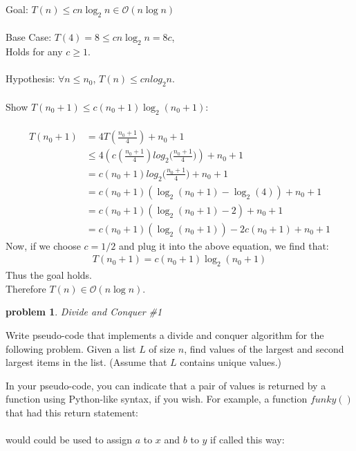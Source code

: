 \documentclass[10pt]{article}
\newtheorem{problem}{\sc\color{cit}problem}
\begin{document}
\begin{enumerate}
    	Goal: $T(n) \leq cn\log_2{n} \in \mathcal{O}(n\log{n})$ \\ \\
    	Base Case: $T(4) = 8 \leq cn\log_2{n} = 8c$, \\
    	Holds for any $c \geq 1$. \\ \\
    	Hypothesis: $\forall n \leq n_0$, $T(n) \leq cnlog_2{n}$. \\ \\
    	Show $T(n_0 + 1) \leq c(n_0 + 1)\log_2{(n_0 + 1)}$: \\ \\
    	\begin{align*}
    	    T(n_0 + 1) &= 4T(\frac{n_0 + 1}{4}) + n_0 + 1 \\
    	    &\leq 4\left(c(\frac{n_0 + 1}{4})log_2{(\frac{n_0 + 1}{4}})\right) + n_0 + 1 \\
    	    &= c(n_0 + 1)log_2{(\frac{n_0 + 1}{4}}) + n_0 + 1 \\
    	    &= c(n_0 + 1)\left(\log_2(n_0 + 1) - \log_2(4)\right) + n_0 + 1 \\
    	    &= c(n_0 + 1)\left(\log_2(n_0 + 1) - 2\right) + n_0 + 1 \\
    	    &= c(n_0 + 1)\left(\log_2(n_0 + 1)\right) - 2c(n_0 + 1) + n_0 + 1
    	\end{align*}
        Now, if we choose $c = 1/2$ and plug it into the above equation, we find that: 
    	\begin{align*}
    	    T(n_0 + 1) = c(n_0 + 1)\log_2{(n_0 + 1)}
    	\end{align*}
    	Thus the goal holds. \\
    	Therefore $T(n) \in \mathcal{O}(n\log{n})$.
      \end{enumerate}   
      
      
\pagebreak

 \begin{problem} Divide and Conquer \#1\end{problem}
    
\noindent
Write pseudo-code that implements a divide and conquer algorithm for the following problem.  Given a list $L$ of size $n$,  find values of the largest and second largest items in the list.  (Assume that $L$ contains unique values.)
	
	In your pseudo-code,  you can indicate that a pair of values is returned by a function using Python-like syntax, if you wish.  For example,  a function $funky()$ that had this return statement: \\
	\hspace*{3em}{\tt return a, b} \\
	would could be used to assign $a$ to $x$ and $b$ to $y$ if called this way: \\
	\hspace*{3em}{\tt (x, y) = funky()} \\
	
\end{document}
